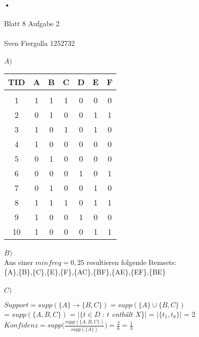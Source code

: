 \documentclass[10pt, a4paper]{article}
\begin{document}
\paragraph{•}
\begin{huge}
Blatt 8 Aufgabe 2
\end{huge}\par
\paragraph{}
\begin{small}
Sven Fiergolla 1252732
\end{small}\par

\paragraph{}
$A)$\\
\begin{tabular}{c||c|c|c|c|c|c}
\textbf{TID} & \textbf{A} & \textbf{B} & \textbf{C} & \textbf{D} & \textbf{E} & \textbf{F} \\
\hline \\
1 & 1 & 1 & 1 & 0 & 0 & 0 \\ \hline 
2 & 0 & 1 & 0 & 0 & 1 & 1 \\ \hline 
3 & 1 & 0 & 1 & 0 & 1 & 0 \\ \hline 
4 & 1 & 0 & 0 & 0 & 0 & 0 \\ \hline
5 & 0 & 1 & 0 & 0 & 0 & 0 \\ \hline
6 & 0 & 0 & 0 & 1 & 0 & 1 \\ \hline
7 & 0 & 1 & 0 & 0 & 1 & 0 \\ \hline
8 & 1 & 1 & 1 & 0 & 1 & 1 \\ \hline
9 & 1 & 0 & 0 & 1 & 0 & 0 \\ \hline
10 & 1 & 0 & 0 & 0 & 1 & 1 \\
\end{tabular}\par

\paragraph{}
$B)$\\
Aus einer $minfreq = 0,25$ resultieren folgende Itemsets:\\
\bigskip
\{A\},\{B\},\{C\},\{E\},\{F\},\{AC\},\{BF\},\{AE\},\{EF\},\{BE\}\par
\paragraph{}
$C)$\\
\begin{center}
$Support = supp(\{A\}\rightarrow\{B,C\}) = supp(\{A\} \cup \{B,C\})$ \\
= $supp(\{A,B,C\})$ =  $|\{t \in D $ : \textit{ $t$ enthält $X$}\}$|$ = $|\{t_1,t_8\}|$ = 2\\
\bigskip
$ Konfidenz = supp({\frac{supp(\{A,B,C\})}{supp(\{A\})})} = \frac{2}{6} = \frac{1}{3}$
\end{center}\par
\end{document}
